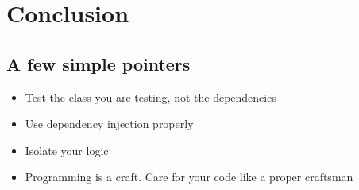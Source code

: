 \documentclass[12pt]{article}
\begin{document}
\section{Conclusion}

\subsection{A few simple pointers}
\begin{itemize}
	\item Test the class you are testing, not the dependencies
	\item Use dependency injection properly
	\item Isolate your logic
	\item Programming is a craft. Care for your code like a proper
craftsman
\end{itemize}
\end{document}
